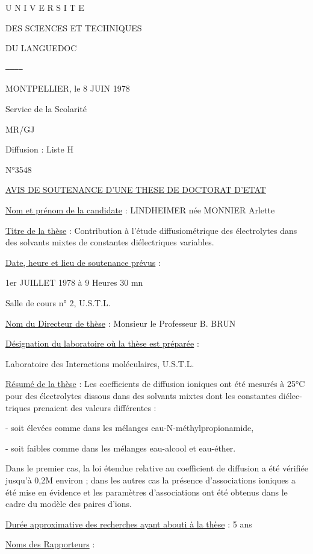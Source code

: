 U N I V E R S I T E

DES SCIENCES ET TECHNIQUES

DU LANGUEDOC

\texttt{------------}

MONTPELLIER, le 8 JUIN 1978

Service de la Scolarité

MR/GJ

Diffusion : Liste H

N°3548

\uline{AVIS DE SOUTENANCE D'UNE THESE DE DOCTORAT D'ETAT}

\uline{Nom et prénom de la candidate} : LINDHEIMER née MONNIER Arlette

\uline{Titre de la thèse} : Contribution à l'étude diffusiométrique des électrolytes dans
des solvants mixtes de constantes diélectriques variables.

\uline{Date, heure et lieu de soutenance prévus} :

1er JUILLET 1978 à 9 Heures 30 mn

Salle de cours n° 2, U.S.T.L.

\uline{Nom du Directeur de thèse} : Monsieur le Professeur B. BRUN

\uline{Désignation du laboratoire où la thèse est préparée} :

Laboratoire des Interactions moléculaires, U.S.T.L.

\uline{Résumé de la thèse} : Les coefficients de diffusion ioniques ont été mesurés à 25°C
pour des électrolytes dissous dans des solvants mixtes dont les constantes diélec-\\
triques prenaient des valeurs différentes :

- soit élevées comme dans les mélanges eau-N-méthylpropionamide,

- soit faibles comme dans les mélanges eau-alcool et eau-éther.

Dans le premier cas, la loi étendue relative au coefficient de
diffusion a été vérifiée jusqu'à 0,2M environ ; dans les autres cas la présence
d'associations ioniques a été mise en évidence et les paramètres d'associations ont
été obtenus dans le cadre du modèle des paires d'ions.

\uline{Durée approximative des recherches ayant abouti à la thèse} : 5 ans

\uline{Noms des Rapporteurs} :


